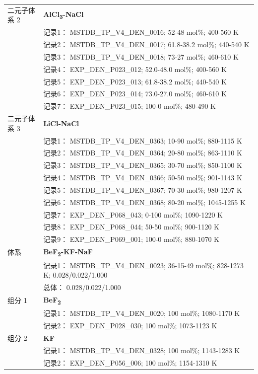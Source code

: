 \documentclass[12pt]{article}
\begin{document}
{\begin{longtable}[]{@{}
  >{\raggedright\arraybackslash}p{}
  >{\raggedright\arraybackslash}p{}@{}}
二元子体系 2  & \textbf{AlCl\textsubscript{3}-NaCl} \\
 & 记录1： MSTDB\_TP\_V4\_DEN\_0016; 52-48 mol\%; 400-560 K \\
 & 记录2： MSTDB\_TP\_V4\_DEN\_0017; 61.8-38.2 mol\%; 440-540 K \\
 & 记录3： MSTDB\_TP\_V4\_DEN\_0018; 73-27 mol\%; 460-610 K \\
 & 记录4： EXP\_DEN\_P023\_012; 52.0-48.0 mol\%; 400-560 K \\
 & 记录5： EXP\_DEN\_P023\_013; 61.8-38.2 mol\%; 440-540 K \\
 & 记录6： EXP\_DEN\_P023\_014; 73.0-27.0 mol\%; 460-610 K \\
 & 记录7： EXP\_DEN\_P023\_015; 100-0 mol\%; 480-490 K  \\

二元子体系 3  & \textbf{LiCl-NaCl} \\
 & 记录1： MSTDB\_TP\_V4\_DEN\_0363; 10-90 mol\%; 880-1115 K \\
 & 记录2： MSTDB\_TP\_V4\_DEN\_0364; 20-80 mol\%; 863-1110 K \\
 & 记录3： MSTDB\_TP\_V4\_DEN\_0365; 30-70 mol\%; 850-1100 K \\
 & 记录4： MSTDB\_TP\_V4\_DEN\_0366; 50-50 mol\%; 901-1143 K \\
 & 记录5： MSTDB\_TP\_V4\_DEN\_0367; 70-30 mol\%; 980-1207 K \\
 & 记录6： MSTDB\_TP\_V4\_DEN\_0368; 80-20 mol\%; 1045-1255 K \\
 & 记录7： EXP\_DEN\_P068\_043; 0-100 mol\%; 1090-1220 K \\
 & 记录8： EXP\_DEN\_P068\_044; 50-50 mol\%; 900-1120 K \\
 & 记录9： EXP\_DEN\_P069\_001; 100-0 mol\%; 880-1070 K  \\

\midrule
体系 & \textbf{BeF\textsubscript{2}-KF-NaF} \\
 & 记录1： MSTDB\_TP\_V4\_DEN\_0023; 36-15-49 mol\%; 828-1273 K; 0.028/0.022/1.000 \\
 & 总体： 0.028/0.022/1.000  \\

组分 1  & \textbf{BeF\textsubscript{2}} \\
 & 记录1： MSTDB\_TP\_V4\_DEN\_0020; 100 mol\%; 1080-1170 K \\
 & 记录2： EXP\_DEN\_P028\_030; 100 mol\%; 1073-1123 K  \\

组分 2  & \textbf{KF} \\
 & 记录1： MSTDB\_TP\_V4\_DEN\_0328; 100 mol\%; 1143-1283 K \\
 & 记录2： EXP\_DEN\_P056\_006; 100 mol\%; 1154-1310 K  \\


\end{longtable}}
\end{document}
